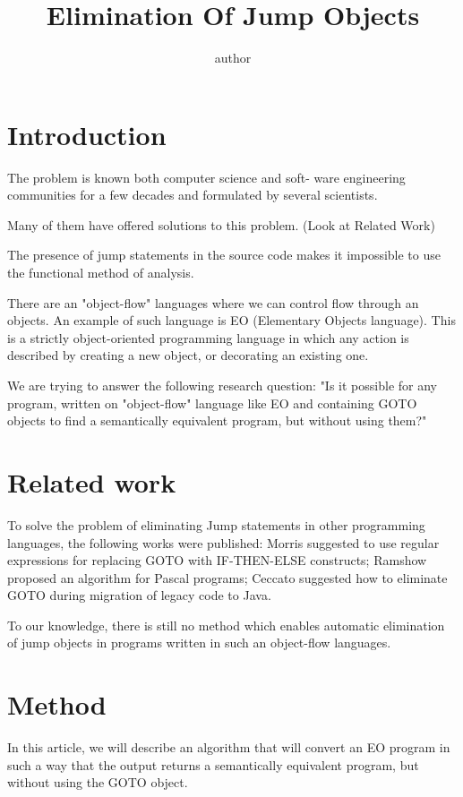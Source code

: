 \documentclass[sigplan,review,11pt,nonacm,natbib=false]{acmart}
\title{Elimination Of Jump Objects}
\author{author}
\begin{document}
\maketitle

\section{Introduction}
The problem is known both computer science and soft-
ware engineering communities for a few decades and formulated by several scientists.

Many of them have offered solutions to this problem. (Look at Related Work)

The presence of jump statements in the source code makes it impossible to use the functional method of analysis.

There are an "object-flow" languages where we can control flow through an objects. An example of such language is EO (Elementary Objects language). This is a strictly object-oriented programming language in which any action is described by creating a new object, or decorating an existing one.

We are trying to answer the following research question: "Is it possible for any program, written on "object-flow" language like EO and containing GOTO objects to find a semantically equivalent program, but without using them?"

\section{Related work}
To solve the problem of eliminating Jump statements in other programming languages, the following works were published:
Morris suggested to use regular expressions for replacing GOTO with IF-THEN-ELSE constructs;
Ramshow proposed an algorithm for Pascal programs;
Ceccato suggested how to eliminate GOTO during migration of legacy code to Java.

To our knowledge, there is still no method which enables automatic elimination of jump objects in programs written in such an object-flow languages.

\section{Method}
In this article, we will describe an algorithm that will convert an EO program in such a way that the output returns a semantically equivalent program, but without using the GOTO object.
\end{document}
